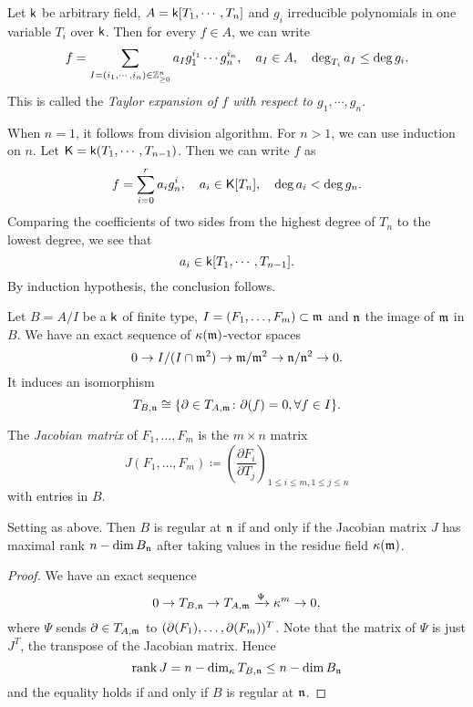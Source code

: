     \begin{remark}\label{remark: Taylor expansion with respect to irreducible polynomials}
        Let \(\kk\) be arbitrary field, \(A = \kk[T_1,\cdots,T_n]\) and \(g_i\) irreducible polynomials in one variable \(T_i\) over \(\kk\).
        Then for every \(f \in A\), we can write
        \[ f = \sum_{I=(i_1,\cdots,i_n) \in \bbz_{\geq 0}^n} a_I g_1^{i_1}\cdots g_n^{i_n}, \quad a_I \in A, \quad \deg_{T_i} a_I \leq \deg g_i.\]
        This is called the \textit{Taylor expansion of \(f\) with respect to \(g_1,\cdots,g_n\)}. 

        When \(n = 1\), it follows from division algorithm.
        For \(n > 1\), we can use induction on \(n\).
        Let \(\KK = \kk(T_1,\cdots,T_{n-1})\).
        Then we can write \(f\) as
        \[ f = \sum_{i=0}^{r} a_i g_n^i, \quad a_i \in \KK[T_n],\quad \deg a_i < \deg g_n. \]
        Comparing the coefficients of two sides from the highest degree of \(T_n\) to the lowest degree, we see that 
        \[a_i \in \kk[T_1,\cdots,T_{n-1}].\]
        By induction hypothesis, the conclusion follows.
    \end{remark}

    Let \(B = A/I\) be a \(\kk\) of finite type, \(I = (F_1,\ldots,F_m) \subset \frakm\) and \(\frakn\) the image of \(\frakm\) in \(B\).
    We have an exact sequence of \(\rkk(\frakm)\)-vector spaces
    \[ 0 \to I/(I\cap \frakm^2) \to \frakm/\frakm^2 \to \frakn/\frakn^2 \to 0. \]
    It induces an isomorphism
    \[ T_{B,\frakn} \cong \{ \P \in T_{A,\frakm} \colon \P(f) = 0, \forall f \in I \}. \] 

    The \emph{Jacobian matrix} of \(F_1, \ldots, F_m\) is the \(m \times n\) matrix
    \[
        J(F_1, \ldots, F_m) \coloneqq \left( \frac{\partial F_i}{\partial T_j} \right)_{1 \leq i \leq m, 1 \leq j \leq n}
    \] 
    with entries in \(B\).

    \begin{theorem}\label{thm: Jacobian criterion}
        Setting as above.
        Then \(B\) is regular at \(\frakn\) if and only if the Jacobian matrix \(J\) has maximal rank \(n - \dim B_\frakn\) after taking values in the residue field \(\rkk(\frakm)\).
    \end{theorem}
    \begin{proof}
        We have an exact sequence
        \[ 0 \to T_{B,\frakn} \to T_{A,\frakm} \xrightarrow{\Psi} \rkk^m \to 0, \]
        where \(\Psi\) sends \(\P \in T_{A,\frakm}\) to \((\P(F_1), \ldots, \P(F_m))^T \).
        Note that the matrix of \(\Psi\) is just \(J^T\), the transpose of the Jacobian matrix.
        Hence 
        \[ \rank J = n - \dim_\rkk T_{B,\frakn} \leq n - \dim B_\frakn \] 
        and the equality holds if and only if \(B\) is regular at \(\frakn\).
    \end{proof}

